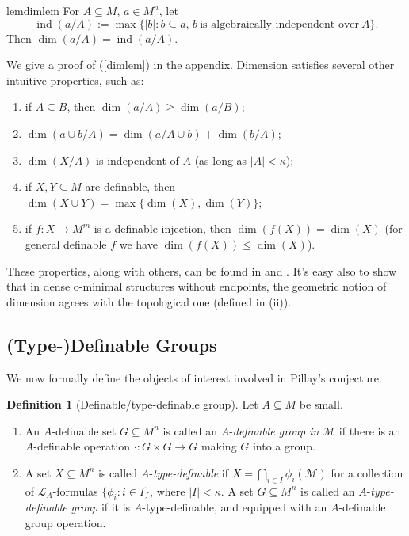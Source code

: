 \documentclass[a4paper]{report}
\newcommand{\ind}{\hspace{15pt}}
\renewcommand{\L}{\mathcal{L}}
\newcommand{\M}{\mathcal{M}}
\DeclareMathOperator{\aind}{ind}
\theoremstyle{definition}
\newtheorem{defn}[thm]{Definition}
\theoremstyle{remstyle}
\begin{document}
\begin{restatable}[]{lem}{dimlem}\label{dimlem}
	For $A\subseteq M$, $a\in M^n$, let
	\begin{equation*}
		\aind(a/A) := \max\{|b|:b\subseteq a,\, b\ \text{is algebraically independent over}\ A\}.
	\end{equation*}
	Then $\dim(a/A)=\aind(a/A)$.
\end{restatable}

\ind We give a proof of (\ref{dimlem}) in the appendix. Dimension satisfies several other intuitive properties, such as:
\begin{enumerate}
	\item if $A\subseteq B$, then $\dim(a/A)\geq\dim(a/B)$;
	\item $\dim(a\cup b/A)=\dim(a/A\cup b)+\dim(b/A)$;
	\item $\dim(X/A)$ is independent of $A$ (as long as $|A|<\kappa$);
	\item if $X,Y\subseteq M$ are definable, then $\dim(X\cup Y)=\max\{\dim(X),\dim(Y)\}$;
	\item if $f:X\to M^m$ is a definable injection, then $\dim(f(X))=\dim(X)$ (for general definable $f$ we have $\dim(f(X))\leq\dim(X)$).
\end{enumerate}
These properties, along with others, can be found in \cite{ominandvariations} and \cite{groups def omin}. It's easy also to show that in dense o-minimal structures without endpoints, the geometric notion of dimension agrees with the topological one (defined in  (ii)).

\subsection{(Type-)Definable Groups}

\ind We now formally define the objects of interest involved in Pillay's conjecture.

\begin{defn}[Definable/type-definable group] Let $A\subseteq M$ be small.
	\begin{enumerate}
		\item An $A$-definable set $G\subseteq M^n$ is called an $A$-\emph{definable group in} $\M$ if there is an $A$-definable operation $\cdot:G\times G\to G$ making $G$ into a group.
		\item A set $X\subseteq M^n$ is called $A$-\emph{type-definable} if $X=\bigcap_{i\in I}\phi_i(\M)$ for a collection of $\L_A$-formulas $\{\phi_i:i\in I\}$, where $|I|<\kappa$. A set $G\subseteq M^n$ is called an $A$-\emph{type-definable group} if it is $A$-type-definable, and equipped with an $A$-definable group operation.
	\end{enumerate}
\end{defn}
\end{document}
